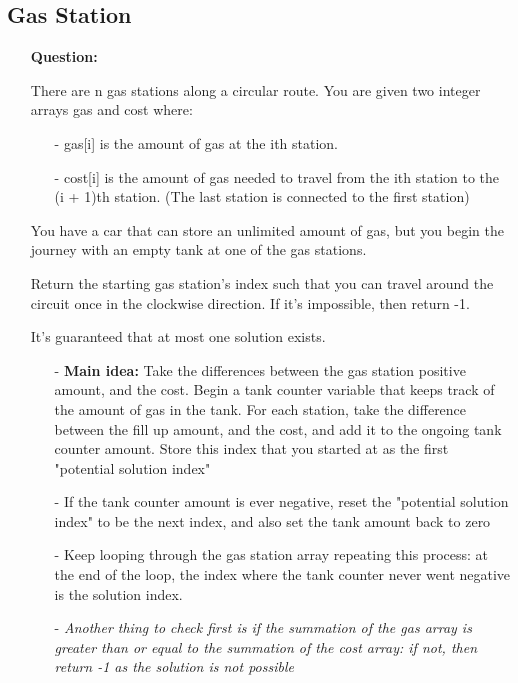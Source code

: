 \documentclass[12pt]{article}
\begin{document}
\subsection{Gas Station}
\begin{enumerate}
  \item[] \textbf{Question:}

   There are n gas stations along a circular route. You are given two integer arrays gas and cost where:
   \begin{enumerate}
     \item[-] gas[i] is the amount of gas at the ith station.
     \item[-] cost[i] is the amount of gas needed to travel from the ith station to the (i + 1)th station. (The last station is connected to the first station)

\end{enumerate}
You have a car that can store an unlimited amount of gas, but you begin the journey with an empty tank at one of the gas stations.

Return the starting gas station's index such that you can travel around the circuit once in the clockwise direction. If it's impossible, then return -1.

It's guaranteed that at most one solution exists.


    \begin{enumerate}
      \item[-] \textbf{Main idea:} Take the differences between the gas station positive amount, and the cost. Begin a tank counter variable that keeps track of the amount of gas in the tank. For each station, take the difference between the fill up amount, and the cost, and add it to the ongoing tank counter amount. Store this index that you started at as the first "potential solution index"
      \item[-] If the tank counter amount is ever negative, reset the "potential solution index" to be the next index, and also set the tank amount back to zero
      \item[-] Keep looping through the gas station array repeating this process: at the end of the loop, the index where the tank counter never went negative is the solution index.
      \item[-] \textit{Another thing to check first is if the summation of the gas array is greater than or equal to the summation of the cost array: if not, then return -1 as the solution is not possible}
    \end{enumerate}
\end{enumerate}
\end{document}
